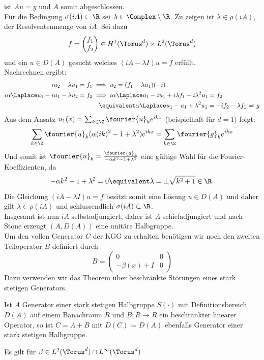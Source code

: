 ist $Au=y$ und $A$ somit abgeschlossen.\\
Für die Bedingung $\sigma(iA)\subset \R$ sei $\lambda \in\Complex\setminus\R$. Zu zeigen ist $\lambda \in\rho(iA)$, der Resolventenmenge von $iA$. Sei dazu
\[f=\begin{pmatrix}f_1\\f_2\end{pmatrix}\in H^1(\Torus^d)\times L^2(\Torus^d)\]
und ein $u\in D(A)$ gesucht welches $(iA-\lambda I)u=f$ erfüllt.\\
Nachrechnen ergibt:
\begin{align*}
iu_2-\lambda u_1=f_1 &\implies u_2=(f_1+\lambda u_1)(-i)\\
i\alpha \Laplace u_1-iu_1-\lambda u_2=f_2 &\implies i\alpha \Laplace u_1-iu_1+i\lambda f_1+i\lambda^2u_1=f_2\\
&\quad \equivalent \alpha \Laplace u_1-u_1+\lambda^2u_1=-if_2-\lambda f_1\eqqcolon g
\end{align*}
Aus dem Ansatz $u_1(x)=\sum_{k\in\Z}\fourier{u}_ke^{ikx}$ (beispielhaft für $d=1$) folgt:
\[\sum_{k\in\Z}\fourier{u}_k(\alpha (ik)^2-1+\lambda^2)e^{ikx}=\sum_{k\in\Z}\fourier{g}_ke^{ikx}\]
Und somit ist $\fourier{u}_k=\frac{\fourier{g}_k}{-\alpha k^2-1+\lambda^2}$ eine gültige Wahl für die Fourier-Koeffizienten, da 
\[-\alpha k^2-1+\lambda^2=0\equivalent \lambda =\pm \sqrt{k^2+1}\in\R.\]
Die Gleichung $(iA-\lambda I)u=f$ besitzt somit eine Lösung $u\in D(A)$ und daher gilt $\lambda \in \rho(iA)$ und schlussendlich $\sigma(iA)\subset \R$.\\
Insgesamt ist nun $iA$ selbstadjungiert, daher ist $A$ schiefadjungiert und nach Stone erzeugt $(A,D(A))$ eine unitäre Halbgruppe.\\[0.3cm] 
Um den vollen Generator $C$ der KGG zu erhalten benötigen wir noch den zweiten Teiloperator $B$ definiert durch
\[B=\begin{pmatrix}0 & 0\\-\beta(x)+I & 0\end{pmatrix}\]
Dazu verwenden wir das Theorem über beschränkte Störungen eines stark stetigen Generators.
\begin{maththeorem}
Ist $A$ Generator einer stark stetigen Halbgruppe $S(\cdot)$ mit Definitionsbereich $D(A)$ auf einem Banachraum $R$ und $B\colon R\to R$ ein beschränkter linearer Operator, so ist
$C=A+B$ mit $D(C)\coloneqq D(A)$ ebenfalls Generator einer stark stetigen Halbgruppe.
\end{maththeorem}
Es gilt für $\beta\in L^2(\Torus^d)\cap L^\infty(\Torus^d)$
